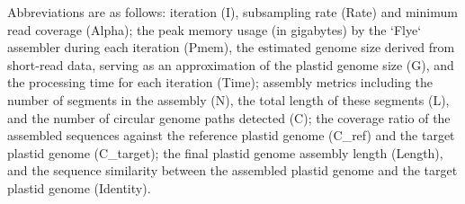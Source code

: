 \begingroup
\scriptsize
\setlength{\parskip}{2pt}

Abbreviations are as follows: iteration (I), subsampling rate (Rate) and minimum read coverage (Alpha);
the peak memory usage (in gigabytes) by the `Flye` assembler during each iteration (Pmem),
the estimated genome size derived from short-read data, serving as an approximation of the plastid genome size (G), and
the processing time for each iteration (Time);
assembly metrics including the number of segments in the assembly (N), the total length of these segments (L), and
the number of circular genome paths detected (C);
the coverage ratio of the assembled sequences against the reference plastid genome (C_ref) and the target plastid genome (C_target);
the final plastid genome assembly length (Length), and the sequence similarity between the assembled plastid genome and the target plastid genome (Identity).

\endgroup


